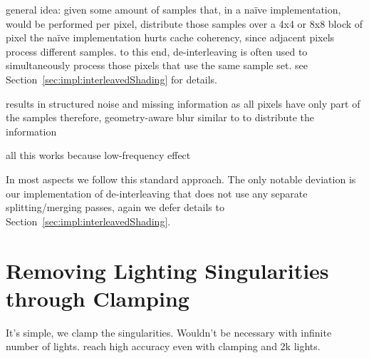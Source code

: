\begin{outline}
\1 general idea: given some amount of samples that, in a naïve implementation, would be performed per pixel, distribute those samples over a 4x4 or 8x8 block of pixel
\1 the naïve implementation hurts cache coherency, since adjacent pixels process different samples.
\1 to this end, de-interleaving \citep{segovia2006non} is often used to simultaneously process those pixels that use the same sample set. see Section~\ref{sec:impl:interleavedShading} for details.

\1 results in structured noise and missing information as all pixels have only part of the samples
\1 therefore, geometry-aware blur similar to \citet{laine2007incremental} to distribute the information

\1 all this works because low-frequency effect

\1 In most aspects we follow this standard approach. The only notable deviation is our implementation of de-interleaving that does not use any separate splitting/merging passes, again we defer details to Section~\ref{sec:impl:interleavedShading}.

\end{outline}



\section{Removing Lighting Singularities through Clamping}
\label{sec:concept:clamping}
It's simple, we clamp the singularities. Wouldn't be necessary with infinite number of lights. \citet{hedman2016sequential} reach high accuracy even with clamping and 2k lights.
